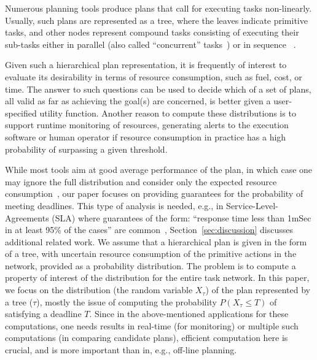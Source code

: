 \documentclass[review]{elsarticle}
\begin{document}
Numerous planning tools produce plans that call for executing tasks non-linearly.
Usually, such plans are represented as a tree, where the
leaves indicate primitive tasks, and other nodes represent compound tasks consisting of executing their sub-tasks either in parallel (also called ``concurrent'' tasks~\cite{gabaldon2002programming}) or in sequence ~\cite{erol1994htn,nau1998control,nau2003shop2,kelly2008offline}.

Given such a hierarchical plan representation, it is frequently of interest to evaluate its desirability in terms of resource consumption, such as fuel, cost, or time. The answer to such questions can be used to decide which of a set of plans, all valid as far as achieving the goal(s) are concerned, is better given a user-specified utility function. Another reason to compute these distributions is to support runtime monitoring of resources, generating alerts to the execution software or human operator if resource consumption in practice has a high probability of surpassing a given threshold.

While most tools aim at good average performance of the plan, in which case one may ignore the 
full distribution and consider only the expected resource consumption~\cite{bonfietti2014disregarding}, our paper focuses
on providing guarantees for the probability of meeting deadlines. This type of analysis is needed, e.g., in
Service-Level-Agreements (SLA) where guarantees of the form: ``response time less than 1mSec in at least 95\% of the cases'' are common~\cite{buyya2011sla}, 
Section~\ref{sec:discussion} discusses additional related work.
We assume that a hierarchical plan is given in the form of a tree, with uncertain resource consumption of the primitive actions in the network, provided as a probability distribution. The problem is to compute a property of interest of the distribution for the entire task
 network. 
In this paper, we focus on the distribution 
(the random variable $X_\tau$) of the plan represented by a tree ($\tau$),
mostly the issue of computing the probability $P(X_\tau \leq T)$ of satisfying a deadline $T$. Since in the above-mentioned applications for these computations, one needs results in real-time (for monitoring) or multiple such computations (in comparing candidate plans), efficient computation here is crucial, and is more important than in, e.g., off-line planning.
\end{document}
